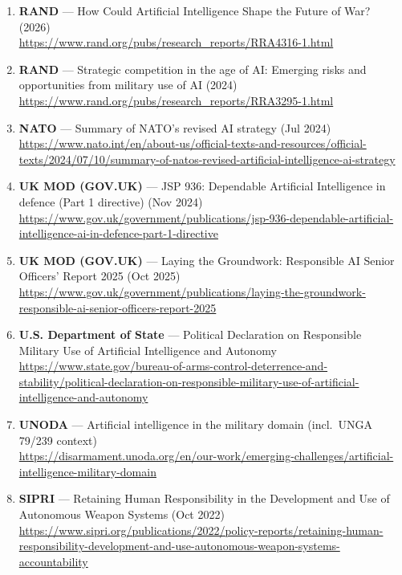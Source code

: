 \documentclass[11pt]{article}
\begin{document}
\begin{enumerate}
  AI-Enabled Warfare (Feb 2026)\\
  \url{https://www.csis.org/analysis/how-russia-reshaping-command-and-control-ai-enabled-warfare}
\item
  \textbf{RAND} --- How Could Artificial Intelligence Shape the Future
  of War? (2026)\\
  \url{https://www.rand.org/pubs/research_reports/RRA4316-1.html}
\item
  \textbf{RAND} --- Strategic competition in the age of AI: Emerging
  risks and opportunities from military use of AI (2024)\\
  \url{https://www.rand.org/pubs/research_reports/RRA3295-1.html}
\item
  \textbf{NATO} --- Summary of NATO's revised AI strategy (Jul 2024)\\
  \url{https://www.nato.int/en/about-us/official-texts-and-resources/official-texts/2024/07/10/summary-of-natos-revised-artificial-intelligence-ai-strategy}
\item
  \textbf{UK MOD (GOV.UK)} --- JSP 936: Dependable Artificial
  Intelligence in defence (Part 1 directive) (Nov 2024)\\
  \url{https://www.gov.uk/government/publications/jsp-936-dependable-artificial-intelligence-ai-in-defence-part-1-directive}
\item
  \textbf{UK MOD (GOV.UK)} --- Laying the Groundwork: Responsible AI
  Senior Officers' Report 2025 (Oct 2025)\\
  \url{https://www.gov.uk/government/publications/laying-the-groundwork-responsible-ai-senior-officers-report-2025}
\item
  \textbf{U.S. Department of State} --- Political Declaration on
  Responsible Military Use of Artificial Intelligence and Autonomy\\
  \url{https://www.state.gov/bureau-of-arms-control-deterrence-and-stability/political-declaration-on-responsible-military-use-of-artificial-intelligence-and-autonomy}
\item
  \textbf{UNODA} --- Artificial intelligence in the military domain
  (incl.~UNGA 79/239 context)\\
  \url{https://disarmament.unoda.org/en/our-work/emerging-challenges/artificial-intelligence-military-domain}
\item
  \textbf{SIPRI} --- Retaining Human Responsibility in the Development
  and Use of Autonomous Weapon Systems (Oct 2022)\\
  \url{https://www.sipri.org/publications/2022/policy-reports/retaining-human-responsibility-development-and-use-autonomous-weapon-systems-accountability}

\end{enumerate}
\end{document}
